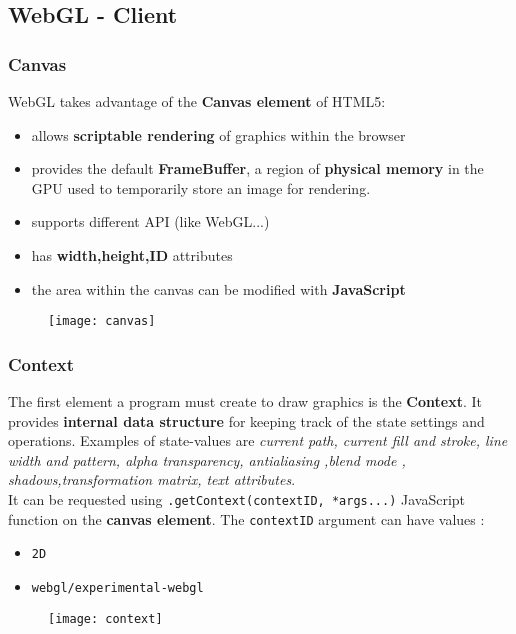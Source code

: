 \subsection{WebGL - Client}
\subsubsection{Canvas}
WebGL takes advantage of the \textbf{Canvas element} of HTML5:
\begin{itemize}
\item allows \textbf{scriptable rendering} of graphics within the browser
\item provides the default \textbf{FrameBuffer}, a region of \textbf{physical memory} in the GPU used to temporarily store an image for rendering.
\item supports different API (like WebGL...)
\item has \textbf{width,height,ID} attributes
\item the area within the canvas can be modified with \textbf{JavaScript}
\end{itemize}
 \begin{figure}[H]
 \centering
 \texttt{[image: canvas]} 
 \end{figure}

 
\subsubsection{Context}
The first element a program must create to draw graphics is the \textbf{Context}. It provides \textbf{internal data structure} for keeping track of the state settings and operations. Examples of state-values are \textit{current path, current fill and stroke, line width and pattern, alpha transparency, antialiasing ,blend mode , shadows,transformation matrix, text attributes}.\\
It can be requested using \texttt{.getContext(contextID, *args...)} JavaScript function on the \textbf{canvas element}. The \texttt{contextID} argument can have values :
\begin{itemize}
\item \texttt{2D}
\item \texttt{webgl/experimental-webgl}
\end{itemize}
 \begin{figure}[H]
 \centering
 \texttt{[image: context]} 
 \end{figure}

